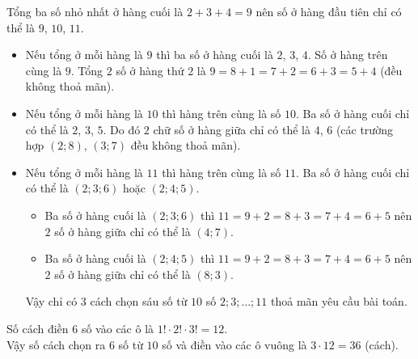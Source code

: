 \begin{ex}%
	\par {}
	\loigiai
	{
		Tổng ba số nhỏ nhất ở hàng cuối là $2+3+4=9$ nên số ở hàng đầu tiên chỉ có thể là $9$, $10$, $11$.
		\begin{itemize}
			\item Nếu tổng ở mỗi hàng là $9$ thì ba số ở hàng cuối là $2$, $3$, $4$. Số ở hàng trên cùng là $9$. Tổng $2$ số ở hàng thứ $2$ là $9=8+1=7+2=6+3=5+4$ (đều không thoả mãn).
			\item Nếu tổng ở mỗi hàng là $10$ thì hàng trên cùng là số $10$. Ba số ở hàng cuối chỉ có thể là $2$, $3$, $5$. Do đó $2$ chữ số ở hàng giữa chỉ có thể là $4$, $6$ (các trường hợp $(2;8)$, $(3;7)$ đều không thoả mãn).
			\item Nếu tổng ở mỗi hàng là $11$ thì hàng trên cùng là số $11$. Ba số ở hàng cuối chỉ có thể là $(2;3;6)$ hoặc $(2;4;5)$.
			\begin{itemize}
				\item Ba số ở hàng cuối là $(2;3;6)$ thì $11=9+2=8+3=7+4=6+5$ nên $2$ số ở hàng giữa chỉ có thể là $(4;7)$.
				\item Ba số ở hàng cuối là $(2;4;5)$ thì $11=9+2=8+3=7+4=6+5$ nên $2$ số ở hàng giữa chỉ có thể là $(8;3)$.
			\end{itemize}
			Vậy chỉ có $3$ cách chọn sáu số từ $10$ số $2;3;\ldots;11$ thoả mãn yêu cầu bài toán.
		\end{itemize}
		Số cách điền $6$ số vào các ô là $1!\cdot 2!\cdot 3!=12$.\\
		Vậy số cách chọn ra $6$ số từ $10$ số và điền vào các ô vuông là $3\cdot 12=36$ (cách).
	}
\end{ex}

